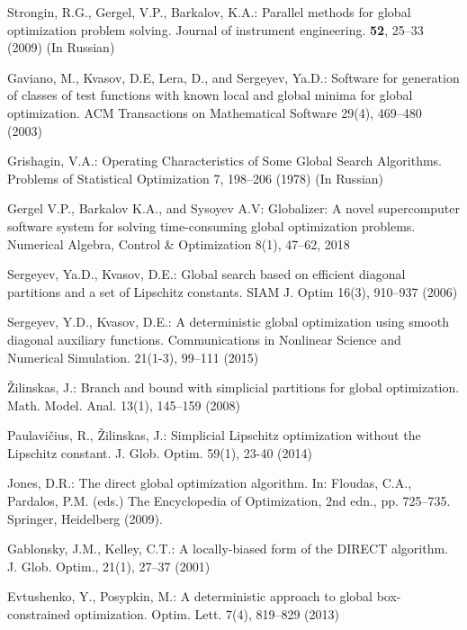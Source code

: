 \documentclass[runningheads]{llncs}
\begin{document}
\begin{thebibliography}{107}
Strongin, R.G., Gergel, V.P., Barkalov, K.A.: Parallel methods for global optimization problem solving. Journal of instrument engineering. \textbf{52}, 25--33 (2009) (In Russian)

Gaviano, M., Kvasov, D.E, Lera, D., and Sergeyev, Ya.D.: Software for generation of classes of test functions with known local and global minima for global optimization. ACM Transactions on Mathematical Software 29(4), 469--480 (2003)

Grishagin, V.A.: Operating Characteristics of Some Global Search Algorithms. Problems of Statistical Optimization 7, 198--206 (1978) (In Russian)

Gergel V.P., Barkalov K.A., and Sysoyev A.V: Globalizer: A novel supercomputer software system for solving time-consuming global optimization problems. Numerical Algebra, Control \& Optimization 8(1), 47--62, 2018

Sergeyev, Ya.D., Kvasov, D.E.: Global search based on efficient diagonal partitions and a set of Lipschitz constants. SIAM J. Optim 16(3), 910–937 (2006)

Sergeyev, Y.D., Kvasov, D.E.: A deterministic global optimization using smooth diagonal auxiliary functions. Communications in Nonlinear Science and Numerical Simulation. 21(1-3), 99--111 (2015)

\v Zilinskas, J.: Branch and bound with simplicial partitions for global optimization. Math. Model. Anal.
13(1), 145–159 (2008)

Paulavi\v cius, R., \v Zilinskas, J.: Simplicial Lipschitz optimization without the Lipschitz constant. J. Glob. Optim. 59(1), 23-40 (2014)

Jones, D.R.: The direct global optimization algorithm. In: Floudas, C.A., Pardalos, P.M.
(eds.) The Encyclopedia of Optimization, 2nd edn., pp. 725--735. Springer, Heidelberg
(2009).

Gablonsky, J.M., Kelley, C.T.: A locally-biased form of the DIRECT algorithm. J. Glob. Optim., 21(1), 27--37 (2001)

Evtushenko, Y., Posypkin, M.: A deterministic approach to global box-constrained
optimization. Optim. Lett. 7(4), 819--829 (2013)



\end{thebibliography}
\end{document}
